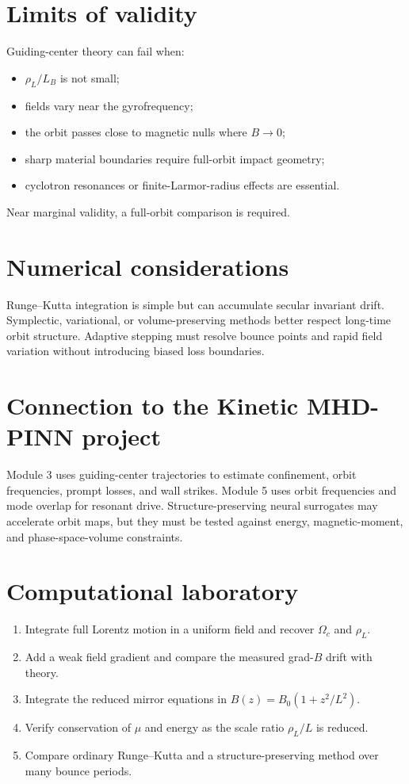 \documentclass[11pt]{article}
\begin{document}
\section{Limits of validity}
Guiding-center theory can fail when:
\begin{itemize}[leftmargin=1.6em]
\item $\rho_L/L_B$ is not small;
\item fields vary near the gyrofrequency;
\item the orbit passes close to magnetic nulls where $B\to0$;
\item sharp material boundaries require full-orbit impact geometry;
\item cyclotron resonances or finite-Larmor-radius effects are essential.
\end{itemize}
Near marginal validity, a full-orbit comparison is required.

\section{Numerical considerations}
Runge--Kutta integration is simple but can accumulate secular invariant drift. Symplectic, variational, or volume-preserving methods better respect long-time orbit structure. Adaptive stepping must resolve bounce points and rapid field variation without introducing biased loss boundaries.

\section{Connection to the Kinetic MHD-PINN project}
Module 3 uses guiding-center trajectories to estimate confinement, orbit frequencies, prompt losses, and wall strikes. Module 5 uses orbit frequencies and mode overlap for resonant drive. Structure-preserving neural surrogates may accelerate orbit maps, but they must be tested against energy, magnetic-moment, and phase-space-volume constraints.

\section{Computational laboratory}
\begin{enumerate}[leftmargin=1.6em]
\item Integrate full Lorentz motion in a uniform field and recover $\Omega_c$ and $\rho_L$.
\item Add a weak field gradient and compare the measured grad-$B$ drift with theory.
\item Integrate the reduced mirror equations in $B(z)=B_0(1+z^2/L^2)$.
\item Verify conservation of $\mu$ and energy as the scale ratio $\rho_L/L$ is reduced.
\item Compare ordinary Runge--Kutta and a structure-preserving method over many bounce periods.
\end{enumerate}
\end{document}
